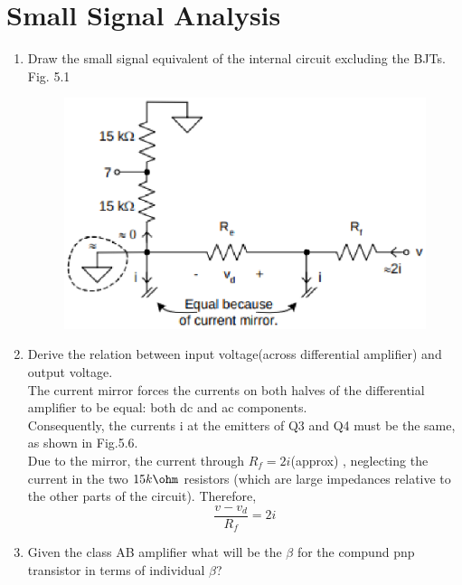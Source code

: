 \documentclass[journal,12pt,twocolumn]{IEEEtran}
\renewcommand\thesection{\arabic{section}}
\begin{document}
\section{Small Signal Analysis}
\begin{enumerate}[label=\thesection.\arabic*,ref=\thesection.\theenumi]
\item Draw the small signal equivalent of the internal circuit excluding the BJTs.\\

\solution Fig. 5.1

\begin{figure}[!ht]
\centering
\includegraphics[width=0.7\columnwidth]{./Fig/LM3866.eps}
\caption{}
\label{fig:2}
\end{figure}

\item Derive the relation between input voltage(across differential amplifier) and output voltage.\\
\solution
The current mirror forces the currents on both halves of the
differential amplifier to be equal: both dc and ac components.\\
Consequently, the currents i at the emitters of Q3 and Q4 must
be the same, as shown in Fig.5.6.\\ Due to the mirror, the current through $R_{f} = 2 i$(approx) , neglecting the current in the two $15k\ohm$ resistors (which are large impedances
relative to the other parts of the circuit). Therefore,\\
$$\frac{v-v_{d}}{R_{f}}=2i$$   

\item Given the class AB amplifier what will be the $\beta$ for the compund pnp transistor in terms of individual $\beta$?

\begin{figure}[!ht]
  \centering
 

\end{figure}
\end{enumerate}
\end{document}
